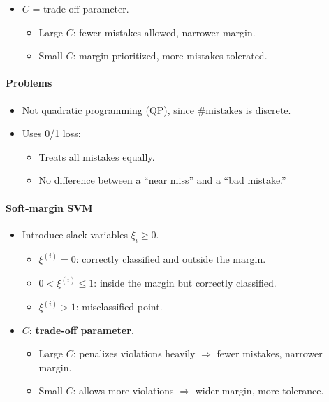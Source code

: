\documentclass[11pt]{article}
\begin{document}
\begin{itemize}
	\item $C$ = trade-off parameter.
	      \begin{itemize}
		      \item Large $C$: fewer mistakes allowed, narrower margin.
		      \item Small $C$: margin prioritized, more mistakes tolerated.
	      \end{itemize}
\end{itemize}

\paragraph*{Problems}
\begin{itemize}
	\item Not quadratic programming (QP), since $\#\text{mistakes}$ is discrete.
	\item Uses 0/1 loss:
	      \begin{itemize}
		      \item Treats all mistakes equally.
		      \item No difference between a ``near miss'' and a ``bad mistake.''
	      \end{itemize}
\end{itemize}

\paragraph*{Soft-margin SVM}

\begin{itemize}
	\item Introduce slack variables $\xi_i \geq 0$.
	      \begin{itemize}
		      \item $\xi^{(i)} = 0$: correctly classified and outside the margin.
		      \item $0 < \xi^{(i)} \leq 1$: inside the margin but correctly classified.
		      \item $\xi^{(i)} > 1$: misclassified point.
	      \end{itemize}
	\item $C$: \textbf{trade-off parameter}.
	      \begin{itemize}
		      \item Large $C$: penalizes violations heavily $\Rightarrow$ fewer mistakes, narrower margin.
		      \item Small $C$: allows more violations $\Rightarrow$ wider margin, more tolerance.
	      \end{itemize}
\end{itemize}
\end{document}

